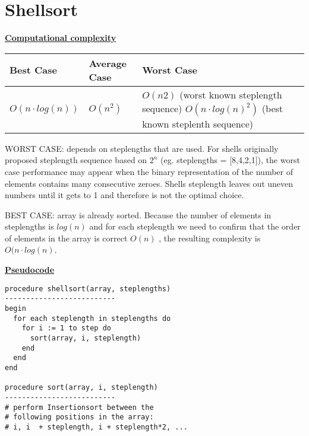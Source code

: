 \documentclass[a4paper]{report}
\begin{document}
\chapter*{Shellsort}

\underline{\bf{Computational complexity}}

\begin{tabular}{|l|l|p{7cm} l |}
\hline
Best Case    & Average Case  &  Worst Case\\ \hline
$O(n\cdot log(n))$ & $O(n^2)$  &  $O(n2)$ (worst known steplength sequence) $O(n\cdot log(n)^2)$ (best known steplenth sequence) \\ \hline
\end{tabular}

WORST CASE: depends on steplengths that are used. For shells originally proposed steplength sequence based on $2^n$ (eg. steplengths = [8,4,2,1]), the worst case performance may appear when the binary representation of the number of elements contains many consecutive zeroes. Shells steplength leaves out uneven numbers until it gets to 1 and therefore is not the optimal choice.

BEST CASE: array is already sorted. Because the number of elements in steplengths is $log(n)$ and for each steplength we need to confirm that the order of elements in the array is correct $O(n)$ , the resulting complexity is $O(n \cdot log(n)$.


\underline{\bf{Pseudocode}}

\begin{lstlisting}
procedure shellsort(array, steplengths)
--------------------------
begin
  for each steplength in steplengths do
    for i := 1 to step do
  	  sort(array, i, steplength)   
    end
  end
end

procedure sort(array, i, steplength)
--------------------------
# perform Insertionsort between the
# following positions in the array:
# i, i  + steplength, i + steplength*2, ...


\end{lstlisting}
\end{document}
